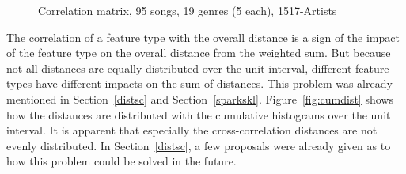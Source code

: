 \begin{figure}[htbp]
	\centering
	\caption{Correlation matrix, 95 songs, 19 genres (5 each), 1517-Artists}
	\label{fig:corr2}
\end{figure}\FloatBarrier

\noindent The correlation of a feature type with the overall distance is a sign of the impact of the feature type on the overall distance from the weighted sum. But because not all distances are equally distributed over the unit interval, different feature types have different impacts on the sum of distances. This problem was already mentioned in Section~\ref{distsc} and Section~\ref{sparkskl}. Figure~\ref{fig:cumdist} shows how the distances are distributed with the cumulative histograms over the unit interval. It is apparent that especially the cross-correlation distances are not evenly distributed. In Section~\ref{distsc}, a few proposals were already given as to how this problem could be solved in the future. 

